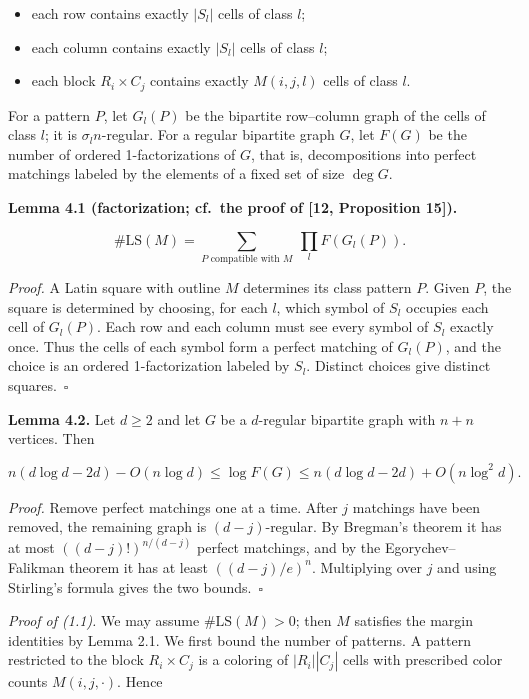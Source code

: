 \documentclass[english,11pt,a4paper]{article}
\providecommand{\tightlist}{\setlength{\itemsep}{0pt}\setlength{\parskip}{0pt}}
\begin{document}
\begin{itemize}
\tightlist
\item
  each row contains exactly \(|S_l|\) cells of class \(l\);
\item
  each column contains exactly \(|S_l|\) cells of class \(l\);
\item
  each block \(R_i\times C_j\) contains exactly \(M(i,j,l)\) cells of class \(l\).
\end{itemize}

For a pattern \(P\), let \(G_l(P)\) be the bipartite row--column graph of the cells of class \(l\); it is \(\sigma_l n\)-regular. For a regular bipartite graph \(G\), let \(F(G)\) be the number of ordered 1-factorizations of \(G\), that is, decompositions into perfect matchings labeled by the elements of a fixed set of size \(\deg G\).

\textbf{Lemma 4.1 (factorization; cf.~the proof of {[}12, Proposition 15{]}).}

\nopagebreak[4]
\[\#\mathrm{LS}(M)=\sum_{P\text{ compatible with }M}\ \prod_l F(G_l(P)).\]

\emph{Proof.} A Latin square with outline \(M\) determines its class pattern \(P\). Given \(P\), the square is determined by choosing, for each \(l\), which symbol of \(S_l\) occupies each cell of \(G_l(P)\). Each row and each column must see every symbol of \(S_l\) exactly once. Thus the cells of each symbol form a perfect matching of \(G_l(P)\), and the choice is an ordered 1-factorization labeled by \(S_l\). Distinct choices give distinct squares.~\(\square\)

\textbf{Lemma 4.2.} Let \(d\ge2\) and let \(G\) be a \(d\)-regular bipartite graph with \(n+n\) vertices. Then

\nopagebreak[4]
\[n(d\log d-2d)-O(n\log d)\le\log F(G)\le n(d\log d-2d)+O(n\log^2 d).\]

\emph{Proof.} Remove perfect matchings one at a time. After \(j\) matchings have been removed, the remaining graph is \((d-j)\)-regular. By Bregman's theorem it has at most \(((d-j)!)^{n/(d-j)}\) perfect matchings, and by the Egorychev--Falikman theorem it has at least \(((d-j)/e)^n\). Multiplying over \(j\) and using Stirling's formula gives the two bounds.~\(\square\)

\emph{Proof of (1.1).} We may assume \(\#\mathrm{LS}(M)>0\); then \(M\) satisfies the margin identities by Lemma 2.1. We first bound the number of patterns. A pattern restricted to the block \(R_i\times C_j\) is a coloring of \(|R_i||C_j|\) cells with prescribed color counts \(M(i,j,\cdot)\). Hence
\end{document}
